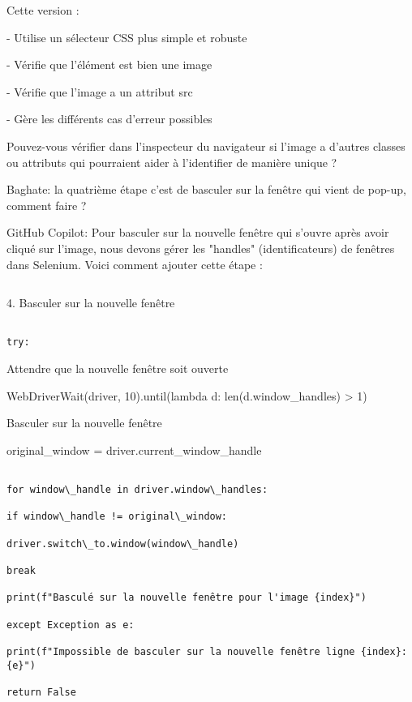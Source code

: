 Cette version :

- Utilise un sélecteur CSS plus simple et robuste

- Vérifie que l'élément est bien une image

- Vérifie que l'image a un attribut src

- Gère les différents cas d'erreur possibles

Pouvez-vous vérifier dans l'inspecteur du navigateur si l'image a d'autres classes ou attributs qui pourraient aider à l'identifier de manière unique ?

Baghate: la quatrième étape c'est de basculer sur la fenêtre qui vient de pop-up, comment faire ?

GitHub Copilot: Pour basculer sur la nouvelle fenêtre qui s'ouvre après avoir cliqué sur l'image, nous devons gérer les "handles" (identificateurs) de fenêtres dans Selenium. Voici comment ajouter cette étape :

\begin{verbatim}

\end{verbatim}

  4. Basculer sur la nouvelle fenêtre

\begin{verbatim}

try:

\end{verbatim}

  Attendre que la nouvelle fenêtre soit ouverte

WebDriverWait(driver, 10).until(lambda d: len(d.window\_handles) > 1)

  Basculer sur la nouvelle fenêtre

original\_window = driver.current\_window\_handle

\begin{verbatim}

for window\_handle in driver.window\_handles:

if window\_handle != original\_window:

driver.switch\_to.window(window\_handle)

break

print(f"Basculé sur la nouvelle fenêtre pour l'image {index}")

except Exception as e:

print(f"Impossible de basculer sur la nouvelle fenêtre ligne {index}: {e}")

return False

\end{verbatim}

